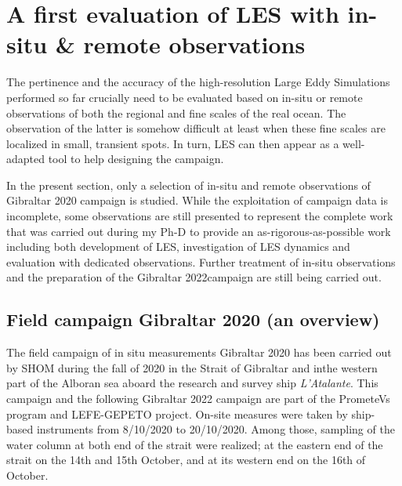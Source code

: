 \hypersetup{pdfborder=0 0 0}


\section[A first evaluation of LES with in-situ \& remote observations]{A first evaluation of LES with in-situ \& remote observations}
\label{sectionCampagne}

The pertinence and the accuracy of the high-resolution Large Eddy Simulations performed so far crucially need to be evaluated based on in-situ or remote observations of both the regional and fine scales of the real ocean. The observation of the latter is somehow difficult at least when these fine scales are localized in small, transient spots. In turn, LES can then appear as a well-adapted tool to help designing the campaign.

In the present section, only a selection of in-situ and remote observations of Gibraltar 2020 campaign is studied. While the exploitation of campaign data is incomplete, some observations are still presented to represent the complete work that was carried out during my Ph-D to provide an as-rigorous-as-possible work including both development of LES, investigation of LES dynamics and evaluation with dedicated observations. Further treatment of in-situ observations and the preparation of the Gibraltar 2022campaign are still being carried out.

\subsection{Field campaign Gibraltar 2020 (an overview)}
The field campaign of in situ measurements Gibraltar 2020 has been carried out by SHOM during the fall of 2020 in the Strait of Gibraltar and inthe western part of the Alboran sea aboard the research and survey ship \textit{L'Atalante}. This campaign and the following Gibraltar 2022 campaign are part of the PrometeVs program and LEFE-GEPETO project. On-site measures were taken by ship-based instruments from 8/10/2020 to 20/10/2020. Among those, sampling of the water column at both end of the strait were realized; at the eastern end of the strait on the 14th and 15th October, and at its western end on the 16th of October.

